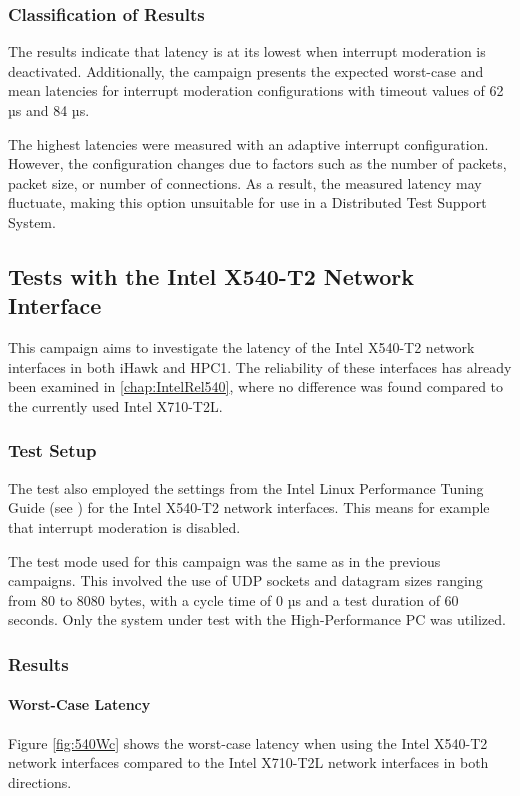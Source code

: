\subsubsection{Classification of Results}
The results indicate that latency is at its lowest when interrupt moderation is deactivated. Additionally, the campaign presents the expected worst-case and mean latencies for interrupt moderation configurations with timeout values of 62 µs and 84 µs.

The highest latencies were measured with an adaptive interrupt configuration. However, the configuration changes due to factors such as the number of packets, packet size, or number of connections. As a result, the measured latency may fluctuate, making this option unsuitable for use in a Distributed Test Support System.

\subsection{Tests with the Intel X540-T2 Network Interface}
This campaign aims to investigate the latency of the Intel X540-T2 network interfaces in both iHawk and HPC1. The reliability of these interfaces has already been examined in \ref{chap:IntelRel540}, where no difference was found compared to the currently used Intel X710-T2L.

\subsubsection{Test Setup}
The test also employed the settings from the Intel Linux Performance Tuning Guide (see \cite{intermod03}) for the Intel X540-T2 network interfaces. This means for example that interrupt moderation is disabled.

The test mode used for this campaign was the same as in the previous campaigns. This involved the use of UDP sockets and datagram sizes ranging from 80 to 8080 bytes, with a cycle time of 0 µs and a test duration of 60 seconds. Only the system under test with the High-Performance PC was utilized.

\subsubsection{Results}
\paragraph{Worst-Case Latency}

Figure \ref{fig:540Wc} shows the worst-case latency when using the Intel X540-T2 network interfaces compared to the Intel X710-T2L network interfaces in both directions.

